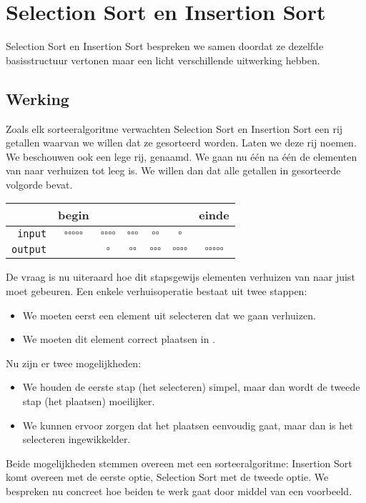 \section{Selection Sort en Insertion Sort}
Selection Sort en Insertion Sort bespreken we samen doordat ze dezelfde basisstructuur
vertonen maar een licht verschillende uitwerking hebben.

\subsection{Werking}
Zoals elk sorteeralgoritme verwachten Selection Sort en Insertion Sort een rij getallen waarvan we willen
dat ze gesorteerd worden. Laten we deze rij  noemen.
We beschouwen ook een lege rij,  genaamd.
We gaan nu \'e\'en na \'e\'en de elementen
van  naar  verhuizen tot  leeg is.
We willen dan dat  alle getallen in gesorteerde volgorde bevat.

\begin{center}
  \begin{tabular}{r|c|c|c|c|c|c}
    & begin & & & & & einde \\
    \hline
    {\tt input} & $\square\square\square\square\square$ &
                  $\square\square\square\square$ &
                  $\square\square\square$ &
                  $\square\square$ &
                  $\square$ \\
    {\tt output} & &
                   $\square$ &
                   $\square\square$ &
                   $\square\square\square$ &
                   $\square\square\square\square$ &
                   $\square\square\square\square\square$                   
  \end{tabular}
\end{center}

De vraag is nu uiteraard hoe dit stapsgewijs elementen verhuizen
van  naar  juist moet gebeuren.
Een enkele verhuisoperatie bestaat uit twee stappen:
\begin{itemize}
  \item We moeten eerst een element uit  selecteren dat we gaan verhuizen.
  \item We moeten dit element correct plaatsen in .
\end{itemize}
Nu zijn er twee mogelijkheden:
\begin{itemize}
  \item We houden de eerste stap (het selecteren) simpel, maar dan wordt de tweede stap (het plaatsen) moeilijker.
  \item We kunnen ervoor zorgen dat het plaatsen eenvoudig gaat, maar dan is het selecteren ingewikkelder. 
\end{itemize}
Beide mogelijkheden stemmen overeen met een sorteeralgoritme:
Insertion Sort komt overeen met de eerste optie, Selection Sort met de tweede optie.
We bespreken nu concreet hoe beiden te werk gaat door middel van een voorbeeld.

